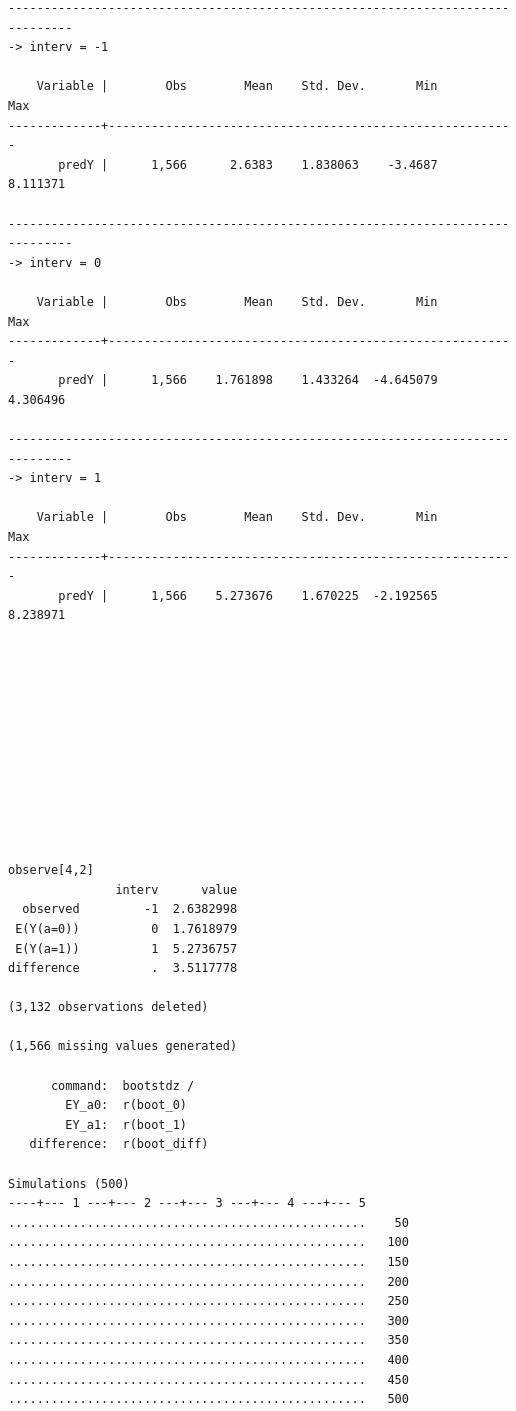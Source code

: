 \documentclass[
  10pt,
]{book}
\begin{document}
\begin{verbatim}
-------------------------------------------------------------------------------
-> interv = -1

    Variable |        Obs        Mean    Std. Dev.       Min        Max
-------------+---------------------------------------------------------
       predY |      1,566      2.6383    1.838063    -3.4687   8.111371

-------------------------------------------------------------------------------
-> interv = 0

    Variable |        Obs        Mean    Std. Dev.       Min        Max
-------------+---------------------------------------------------------
       predY |      1,566    1.761898    1.433264  -4.645079   4.306496

-------------------------------------------------------------------------------
-> interv = 1

    Variable |        Obs        Mean    Std. Dev.       Min        Max
-------------+---------------------------------------------------------
       predY |      1,566    5.273676    1.670225  -2.192565   8.238971












observe[4,2]
               interv      value
  observed         -1  2.6382998
 E(Y(a=0))          0  1.7618979
 E(Y(a=1))          1  5.2736757
difference          .  3.5117778

(3,132 observations deleted)

(1,566 missing values generated)

      command:  bootstdz /
        EY_a0:  r(boot_0)
        EY_a1:  r(boot_1)
   difference:  r(boot_diff)

Simulations (500)
----+--- 1 ---+--- 2 ---+--- 3 ---+--- 4 ---+--- 5 
..................................................    50
..................................................   100
..................................................   150
..................................................   200
..................................................   250
..................................................   300
..................................................   350
..................................................   400
..................................................   450
..................................................   500




\end{verbatim}
\end{document}
